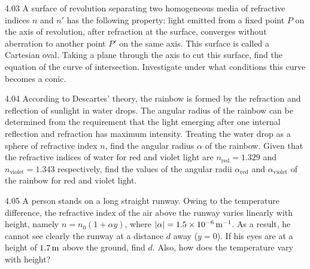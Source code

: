 \begin{problem}{4.03}
A surface of revolution separating two homogeneous media of refractive indices $n$ and $n'$ has the following property: light emitted from a fixed point $P$ on the axis of revolution, after refraction at the surface, converges without aberration to another point $P'$ on the same axis. This surface is called a Cartesian oval. Taking a plane through the axis to cut this surface, find the equation of the curve of intersection. Investigate under what conditions this curve becomes a conic.
\end{problem}

\begin{problem}{4.04}
According to Descartes' theory, the rainbow is formed by the refraction and reflection of sunlight in water drops. The angular radius of the rainbow can be determined from the requirement that the light emerging after one internal reflection and refraction has maximum intensity. Treating the water drop as a sphere of refractive index $n$, find the angular radius $\alpha$ of the rainbow. Given that the refractive indices of water for red and violet light are $n_{\text{red}} = 1.329$ and $n_{\text{violet}} = 1.343$ respectively, find the values of the angular radii $\alpha_{\text{red}}$ and $\alpha_{\text{violet}}$ of the rainbow for red and violet light.
\end{problem}

\begin{problem}{4.05}
A person stands on a long straight runway. Owing to the temperature difference, the refractive index of the air above the runway varies linearly with height, namely $n = n_0(1+\alpha y)$, where $|\alpha| = 1.5\times 10^{-6}\,\mathrm{m^{-1}}$. As a result, he cannot see clearly the runway at a distance $d$ away ($y=0$). If his eyes are at a height of $1.7\,\mathrm{m}$ above the ground, find $d$. Also, how does the temperature vary with height?
\end{problem}

